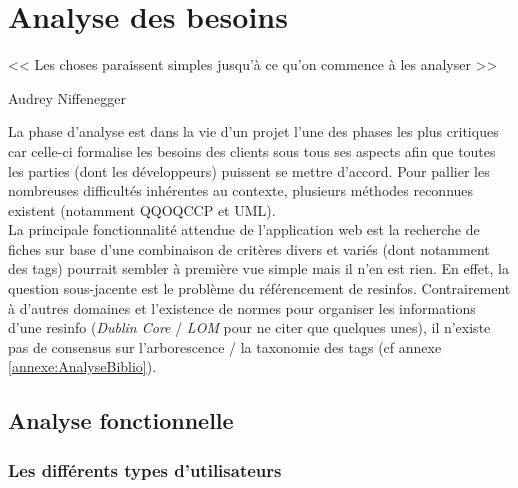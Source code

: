 
\chapter{Analyse des besoins}

\epigraph{<< Les choses paraissent simples jusqu'à ce qu'on commence à les analyser >>}{Audrey Niffenegger}

La phase d'analyse est dans la vie d'un projet l'une des phases les plus critiques car celle-ci formalise les besoins des clients sous tous ses aspects afin que toutes les parties (dont les développeurs) puissent se mettre d'accord. Pour pallier les nombreuses difficultés inhérentes au contexte, plusieurs méthodes reconnues existent (notamment \Gls{QQOQCCP} et UML). \\

La principale fonctionnalité attendue de l'application web est la recherche de \glspl{fiche} sur base d'une combinaison de critères divers et variés (dont notamment des \glspl{tag}) pourrait sembler à première vue simple mais il n'en est rien. En effet, la question sous-jacente est le problème du référencement de \glspl{resinfo}. Contrairement à d'autres domaines et l'existence de normes pour organiser les informations d'une \gls{resinfo} (\textit{Dublin Core} / \textit{LOM} pour ne citer que quelques unes), il n'existe pas de consensus sur l'arborescence / la taxonomie des \glspl{tag} (cf annexe \ref{annexe:AnalyseBiblio}).

\section{Analyse fonctionnelle}
\label{section:analyseFonctionnelle}

\subsection*{Les différents types d'utilisateurs}



